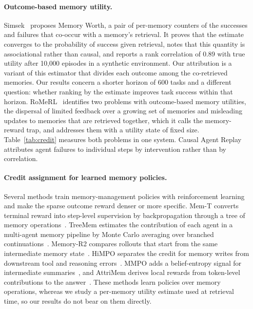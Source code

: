 \documentclass{article}
\begin{document}
\paragraph{Outcome-based memory utility.}
Simsek~\cite{whentoforget} proposes Memory Worth, a pair of per-memory counters of the
successes and failures that co-occur with a memory's retrieval. It proves that the
estimate converges to the probability of success given retrieval, notes that this
quantity is associational rather than causal, and reports a rank correlation of 0.89 with
true utility after 10,000 episodes in a synthetic environment. Our attribution is a
variant of this estimator that divides each outcome among the co-retrieved memories. Our
results concern a shorter horizon of 600 tasks and a different question: whether ranking
by the estimate improves task success within that horizon. RoMeRL~\cite{romerl}
identifies two problems with outcome-based memory utilities, the dispersal of limited
feedback over a growing set of memories and misleading updates to memories that are
retrieved together, which it calls the memory-reward trap, and addresses them with a
utility state of fixed size. Table~\ref{tab:credit} measures both problems in one system.
Causal Agent Replay~\cite{causalreplay} attributes agent failures to individual steps by
intervention rather than by correlation.

\paragraph{Credit assignment for learned memory policies.}
Several methods train memory-management policies with reinforcement learning and make
the sparse outcome reward denser or more specific. Mem-T converts terminal reward into
step-level supervision by backpropagation through a tree of memory
operations~\cite{memt}. TreeMem estimates the contribution of each agent in a
multi-agent memory pipeline by Monte Carlo averaging over branched
continuations~\cite{treecredit}. Memory-R2 compares rollouts that start from the same
intermediate memory state~\cite{memoryr2}. HiMPO separates the credit for memory writes
from downstream tool and reasoning errors~\cite{himpo}. MMPO adds a belief-entropy signal
for intermediate summaries~\cite{metacog}, and AttriMem derives local rewards from
token-level contributions to the answer~\cite{attrimem}. These methods learn policies
over memory operations, whereas we study a per-memory utility estimate used at retrieval
time, so our results do not bear on them directly.
\end{document}
